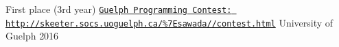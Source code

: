 
\begin{cvhonors}

    \cvhonor 
        {First place (3rd year)}
        {\href{http://skeeter.socs.uoguelph.ca/~sawada//contest.html}{\texttt{Guelph Programming Contest: http://skeeter.socs.uoguelph.ca/\%7Esawada//contest.html}}}
        {University of Guelph}
        {2016}

\end{cvhonors}
